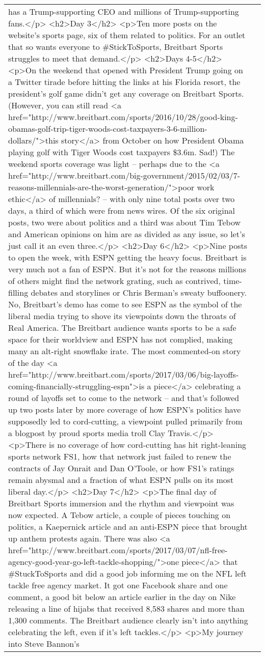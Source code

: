 \documentclass[]{article}
\begin{document}
\begin{table}[!h]
{\begin{tabular}[t]{ll}
has a Trump-supporting CEO and millions of Trump-supporting fans.</p> <h2>Day 3</h2> <p>Ten more posts on the website’s sports page, six of them related to politics. For an outlet that so wants everyone to \#StickToSports, Breitbart Sports struggles to meet that demand.</p> <h2>Days 4-5</h2> <p>On the weekend that opened with President Trump going on a Twitter tirade before hitting the links at his Florida resort, the president’s golf game didn’t get any coverage on Breitbart Sports. (However, you can still read <a href="http://www.breitbart.com/sports/2016/10/28/good-king-obamas-golf-trip-tiger-woods-cost-taxpayers-3-6-million-dollars/">this story</a> from October on how President Obama playing golf with Tiger Woods cost taxpayers \$3.6m. Sad!) The weekend sports coverage was light – perhaps due to the <a href="http://www.breitbart.com/big-government/2015/02/03/7-reasons-millennials-are-the-worst-generation/">poor work ethic</a> of millennials? – with only nine total posts over two days, a third of which were from news wires. Of the six original posts, two were about politics and a third was about Tim Tebow and American opinions on him are as divided as any issue, so let’s just call it an even three.</p> <h2>Day 6</h2> <p>Nine posts to open the week, with ESPN getting the heavy focus. Breitbart is very much not a fan of ESPN. But it’s not for the reasons millions of others might find the network grating, such as contrived, time-filling debates and storylines or Chris Berman’s sweaty buffoonery. No, Breitbart’s demo has come to see ESPN as the symbol of the liberal media trying to shove its viewpoints down the throats of Real America. The Breitbart audience wants sports to be a safe space for their worldview and ESPN has not complied, making many an alt-right snowflake irate. The most commented-on story of the day <a href="http://www.breitbart.com/sports/2017/03/06/big-layoffs-coming-financially-struggling-espn">is a piece</a> celebrating a round of layoffs set to come to the network – and that’s followed up two posts later by more coverage of how ESPN’s politics have supposedly led to cord-cutting, a viewpoint pulled primarily from a blogpost by proud sports media troll Clay Travis.</p> <p>There is no coverage of how cord-cutting has hit right-leaning sports network FS1, how that network just failed to renew the contracts of Jay Onrait and Dan O’Toole, or how FS1’s ratings remain abysmal and a fraction of what ESPN pulls on its most liberal day.</p> <h2>Day 7</h2> <p>The final day of Breitbart Sports immersion and the rhythm and viewpoint was now expected. A Tebow article, a couple of pieces touching on politics, a Kaepernick article and an anti-ESPN piece that brought up anthem protests again. There was also <a href="http://www.breitbart.com/sports/2017/03/07/nfl-free-agency-good-year-go-left-tackle-shopping/">one piece</a> that \#StuckToSports and did a good job informing me on the NFL left tackle free agency market. It got one Facebook share and one comment, a good bit below an article earlier in the day on Nike releasing a line of hijabs that received 8,583 shares and more than 1,300 comments. The Breitbart audience clearly isn’t into anything celebrating the left, even if it’s left tackles.</p> <p>My journey into Steve Bannon’s 
\end{tabular}}
\end{table}
\end{document}
